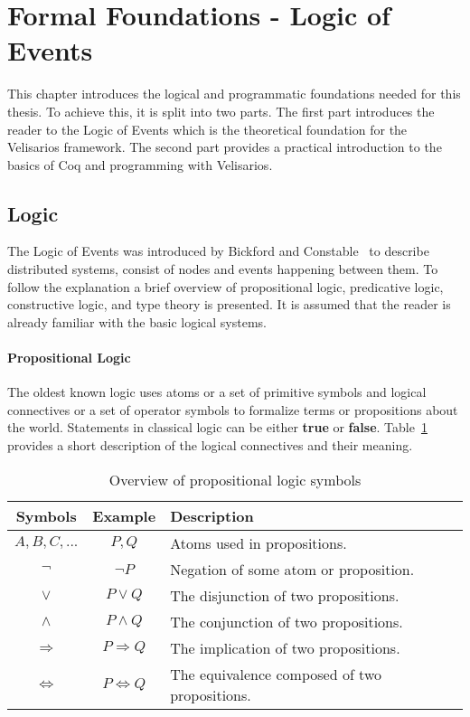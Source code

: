 \section{Formal Foundations - Logic of Events}
\label{sec_logic}

This chapter introduces the logical and programmatic foundations needed for this
thesis. To achieve this, it is split into two parts. The first part introduces
the reader to the Logic of Events which is the theoretical foundation for the
Velisarios framework. The second part provides a practical introduction to
the basics of Coq and programming with Velisarios.

\subsection{Logic}

The Logic of Events was introduced by Bickford and
Constable~\cite{bickford2003logic} to describe distributed systems,
consist of nodes and events happening between them. To follow
the explanation a brief overview of propositional logic, predicative logic,
constructive logic, and type theory is presented. It is assumed that the reader
is already familiar with the basic logical systems.

\paragraph{Propositional Logic}
The oldest known logic uses atoms or a set of primitive symbols and logical
connectives or a set of operator symbols to formalize
terms or propositions about the world. Statements in classical logic can be either
\textbf{true} or \textbf{false}. Table~\ref{tab:proplogic} provides
a short description of the logical connectives and their meaning.~\cite{heinemann2013logik}

\begin{table}[h]
  \centering
  \begin{tabular}{c|c|l}
    Symbols & Example & Description\\\hline
    $A,B,C,...$ & $P, Q$ & Atoms used in propositions.\\
    $\neg$ & $\neg P$ & Negation of some atom or proposition.\\
    $\vee$ & $P \vee Q$ & The disjunction of two propositions.\\
    $\wedge$ & $P \wedge Q$ & The conjunction of two propositions.\\
    $\Rightarrow$ & $P \Rightarrow Q$ & The implication of two propositions.\\
    $\Leftrightarrow$ & $P \Leftrightarrow Q$ & The equivalence composed of two propositions.\\
  \end{tabular}
  \caption{Overview of propositional logic symbols}
  \label{tab:proplogic}
\end{table}

